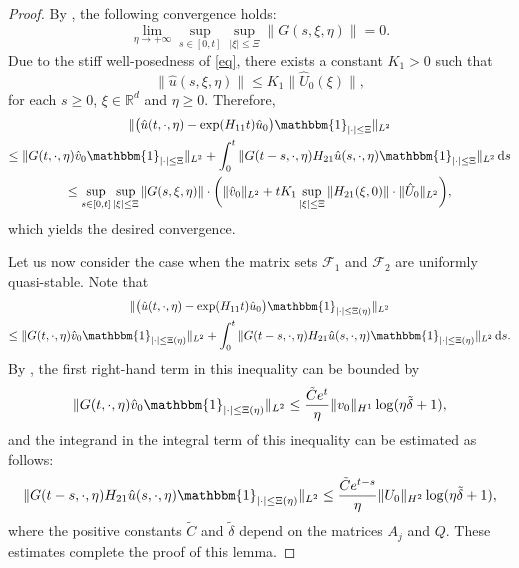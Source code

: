 \documentclass{article}
\theoremstyle{plain}%
\theoremstyle{definition}%
\theoremstyle{remark}%
\newcommand{\bR}{\mathbb{R}}
\newcommand{\cF}{\mathcal{F}}
\newcommand{\rd}{\mathrm{d}}
\newcommand{\+}[1]{{\bm{#1}}}
\newcommand{\norm}[1]{\|{#1}\|}
\begin{document}
\begin{proof}
  By , the following convergence holds:
  \begin{displaymath}
    \lim \limits_{\eta \to +\infty} \sup_{s \in [0, t]} 
    \sup_{|\xi| \le \Xi} \| G(s, \xi, \eta) \| = 0.
  \end{displaymath}
  Due to the stiff well-posedness of \cref{eq}, there exists a 
  constant $K_1 > 0$ such that 
  \begin{displaymath}
    \|{\hat{u}(s, \xi, \eta)}\| \le K_1 \|{\hat{U}_0(\xi)}\|,
  \end{displaymath}
  for each $s \ge 0$, $\xi \in \bR^d$ and $\eta \ge 0$. Therefore, 
  \begin{multline*}
    \norm{ \big( \hat{u}(t, \cdot, \eta) - \exp(H_{11} t) \hat{u}_0
    \big) \mathbbm{1}_{|\cdot| \le \Xi} }_{L^2} \\
    \le \norm{ G(t, \cdot, \eta) \hat{v}_0 
    \mathbbm{1}_{|\cdot| \le \Xi} }_{L^2} 
    + \int_0^t 
    \norm{ G(t-s, \cdot, \eta) H_{21} \hat{u}(s, \cdot, \eta)
    \mathbbm{1}_{|\cdot| \le \Xi} }_{L^2} \,\rd s \\
    \le \sup_{s \in [0, t]} \sup_{|\xi| \le \Xi} \| G(s, \xi, \eta) \|
    \cdot \bigg( \| \hat{v}_0 \|_{L^2} + 
    t K_1 \sup_{|\xi| \le \Xi} \| H_{21}(\xi, 0) \| \cdot
    \| \hat{U}_0 \|_{L^2} \bigg),
  \end{multline*}
  which yields the desired convergence.

  Let us now consider the case when the matrix sets $\cF_1$ and 
  $\cF_2$ are uniformly quasi-stable.
  Note that 
  \begin{multline*}
    \norm{ \big( \hat{u}(t, \cdot, \eta) - \exp(H_{11} t) \hat{u}_0
    \big) \mathbbm{1}_{|\cdot| \le \Xi(\eta)} }_{L^2} \\
    \le \norm{ G(t, \cdot, \eta) \hat{v}_0 
    \mathbbm{1}_{|\cdot| \le \Xi(\eta)} }_{L^2} 
    + \int_0^t 
    \norm{ G(t-s, \cdot, \eta) H_{21} \hat{u}(s, \cdot, \eta)
    \mathbbm{1}_{|\cdot| \le \Xi(\eta)} }_{L^2}
    \,\rd s.
  \end{multline*}
  By ,
  the first right-hand term in this inequality can be bounded by 
  \begin{displaymath}
    \norm{ G(t, \cdot, \eta) \hat{v}_0 
    \mathbbm{1}_{|\cdot| \le \Xi(\eta)} }_{L^2} \le 
    \frac{\tilde{C} e^t}{\eta} \|v_0\|_{H^1}
    \log(\eta \tilde{\delta} + 1),
  \end{displaymath}
  and the integrand in the integral term of this inequality can be 
  estimated as follows:
  \begin{displaymath}
    \norm{ G(t-s, \cdot, \eta) H_{21} \hat{u}(s, \cdot, \eta)
    \mathbbm{1}_{|\cdot| \le \Xi(\eta)} }_{L^2} \le 
    \frac{\tilde{C} e^{t - s}}{\eta} \|U_0\|_{H^2}
    \log(\eta \tilde{\delta} + 1),
  \end{displaymath}
  where the positive constants $\tilde{C}$ and $\tilde{\delta}$ 
  depend on the matrices $A_j$ and $Q$.
  These estimates complete the proof of this lemma.
\end{proof}
\end{document}
